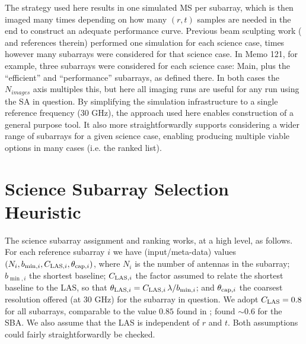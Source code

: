 \documentclass[11pt]{article}
\begin{document}
The strategy used here results in one simulated MS per subarray, which
is then imaged many times depending on how many $(r,t)$ samples are
needed in the end to construct an adequate performance curve. Previous
beam sculpting work (\cite{memo121} and references therein) performed
one simulation for each science case, times however many subarrays
were considered for that science case.  In Memo 121, for example,
three subarrays were considered for each science case: Main, plus the
``efficient'' and ``performance'' subarrays, as defined there. In both
cases the $N_{images}$ axis multiples this, but here all imaging runs
are useful for any run using the SA in question.  By simplifying the
simulation infrastructure to a single reference frequency (30 GHz),
the approach used here enables construction of a general purpose
tool. It also more straightforwardly supports considering a wider
range of subarrays for a given science case, enabling producing
multiple viable options in many cases (i.e. the ranked list).


\section{Science Subarray Selection Heuristic}
\label{sec:heuristic}

The science subarray assignment and ranking works, at a high level, as
follows.  For each reference subarray $i$ we have (input/meta-data)
values $(N_i, b_{\min,i}, C_{{\rm LAS},i}, \theta_{{\rm cap},i})$,
where $N_i$ is the number of antennas in the subarray; $b_{\min,i}$
the shortest baseline; $C_{{\rm LAS},i}$ the factor assumed to relate
the shortest baseline to the LAS, so that $\theta_{{\rm LAS},i} =
C_{{\rm LAS},i}\,\lambda/b_{\min,i}$; and $\theta_{{\rm cap},i}$ the
coarsest resolution offered (at 30 GHz) for the subarray in question.
We adopt $C_{\rm LAS}=0.8$ for all subarrays, comparable to the value
$0.85$ found in \citep{memo67}; \citep{memo67} found $\sim 0.6$ for
the SBA.  We also assume that the LAS is independent of $r$ and $t$.
Both assumptions could fairly straightforwardly be checked.
\end{document}
